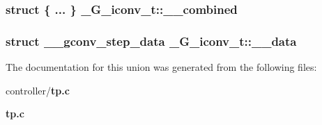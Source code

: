 \subsubsection[{\_\-\_\-combined}]{\setlength{\rightskip}{0pt plus 5cm}struct \{ ... \}   {\bf \_\-G\_\-iconv\_\-t::\_\-\_\-combined}}\label{union__G__iconv__t_a8085a91178d4d1ee8b0788d1d8e5511d}
\subsubsection[{\_\-\_\-data}]{\setlength{\rightskip}{0pt plus 5cm}struct {\bf \_\-\_\-gconv\_\-step\_\-data} {\bf \_\-G\_\-iconv\_\-t::\_\-\_\-data}}\label{union__G__iconv__t_a02d3090d7ca61716f8e04e995c6e69f6}


The documentation for this union was generated from the following files:\begin{DoxyCompactItemize}
\item 
controller/{\bf tp.c}\item 
{\bf tp.c}\end{DoxyCompactItemize}

